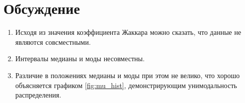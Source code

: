 \documentclass[a4paper,12pt]{article}
\begin{document}
\section{Обсуждение}
\begin{enumerate}
    \item Исходя из значения коэффициента Жаккара можно сказать, что данные не являются совсместными.
    \item Интервалы медианы и моды несовместны.
    \item Различие в положениях медианы и моды при этом не велико, что хорошо объясняется графиком \ref{fig:mu_hist}, демонстрирующим унимодальность распределения.
\end{enumerate}
\end{document}
